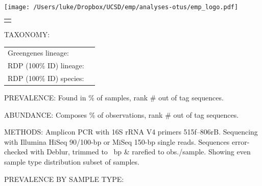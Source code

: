 \documentclass[10pt]{amsart}
\begin{document}


\begin{center}
\texttt{[image: /Users/luke/Dropbox/UCSD/emp/analyses-otus/emp\_logo.pdf]}
\end{center}

\hspace{2cm}
\begin{tabular}{L{5in}}
\texttt{\sequence{}}
\end{tabular}

\begin{raggedright}
\begin{hangparas}{2em}{1}
    TAXONOMY:   
    
    \begin{small}
    \begin{tabular}{@{} X{3.5cm} @{ } X{11cm}}
    Greengenes lineage: & \taxonomyGG{} \tabularnewline
    RDP (100\% ID) lineage: & \taxonomyRDP{} \tabularnewline
    RDP (100\% ID) species: & \speciesA{} \speciesB{} \speciesC{} \tabularnewline
    \end{tabular}
	\end{small}


    PREVALENCE: Found in \prevalencePercent{}\% of samples,
                rank \#\prevalenceRank{} out of \numOTUs{} tag sequences.

    ABUNDANCE:  Composes \abundancePercent{}\% of observations,
                rank \#\abundanceRank{} out of \numOTUs{} tag sequences.
            
    METHODS:    Amplicon PCR with 16S rRNA V4 primers 515f--806rB.
    			Sequencing with Illumina HiSeq 90/100-bp or MiSeq 150-bp single reads.
                Sequences error-checked with Deblur, trimmed to \trimLength{}~bp \& 
                rarefied to \rarefactionDepth{} obs./sample.
                Showing even sample type distribution subset of \numSamples{} samples.

\end{hangparas}

PREVALENCE BY SAMPLE TYPE: \vspace{-7mm}


\end{raggedright}
\end{document}
